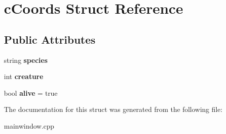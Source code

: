 \hypertarget{structc_coords}{}\section{c\+Coords Struct Reference}
\label{structc_coords}
\subsection*{Public Attributes}
\begin{DoxyCompactItemize}
\item 
\mbox{\label{structc_coords_ad59aec6dd9d3383c46818ee646392e64}} 
string {\bfseries species}
\item 
\mbox{\label{structc_coords_add7f64f8db39b7cb7ee4113024d4095b}} 
int {\bfseries creature}
\item 
\mbox{\label{structc_coords_aee8bc762eddc2b02bce322e34a3b27db}} 
bool {\bfseries alive} = true
\end{DoxyCompactItemize}


The documentation for this struct was generated from the following file\+:\begin{DoxyCompactItemize}
\item 
mainwindow.\+cpp\end{DoxyCompactItemize}
